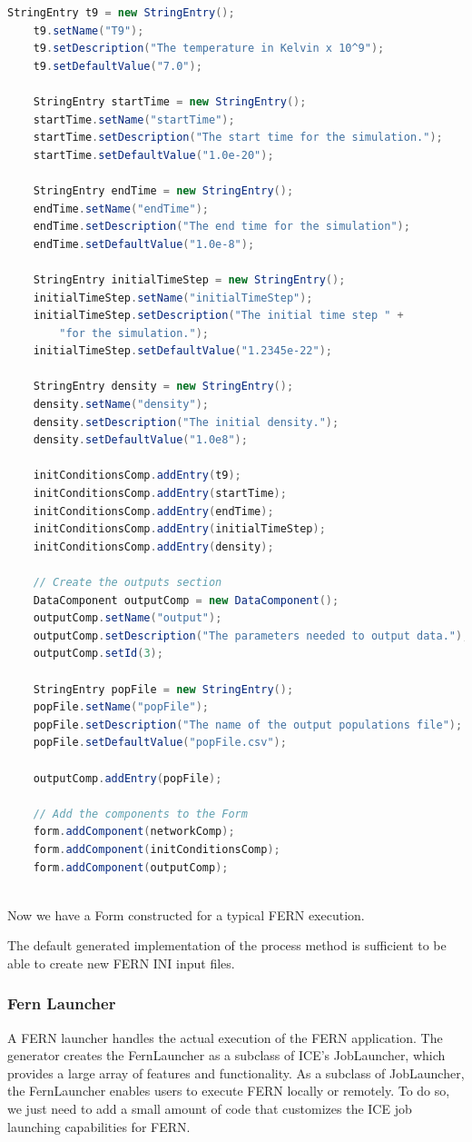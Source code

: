 \begin{lstlisting}[language=Java]
    StringEntry t9 = new StringEntry();
    t9.setName("T9");
    t9.setDescription("The temperature in Kelvin x 10^9");
    t9.setDefaultValue("7.0");

    StringEntry startTime = new StringEntry();
    startTime.setName("startTime");
    startTime.setDescription("The start time for the simulation.");
    startTime.setDefaultValue("1.0e-20");

    StringEntry endTime = new StringEntry();
    endTime.setName("endTime");
    endTime.setDescription("The end time for the simulation");
    endTime.setDefaultValue("1.0e-8");

    StringEntry initialTimeStep = new StringEntry();
    initialTimeStep.setName("initialTimeStep");
    initialTimeStep.setDescription("The initial time step " + 
    	"for the simulation."); 
    initialTimeStep.setDefaultValue("1.2345e-22");

    StringEntry density = new StringEntry();
    density.setName("density");
    density.setDescription("The initial density.");
    density.setDefaultValue("1.0e8");
    
    initConditionsComp.addEntry(t9);
    initConditionsComp.addEntry(startTime);
    initConditionsComp.addEntry(endTime);
    initConditionsComp.addEntry(initialTimeStep);
    initConditionsComp.addEntry(density);
    
    // Create the outputs section
    DataComponent outputComp = new DataComponent();
    outputComp.setName("output");
    outputComp.setDescription("The parameters needed to output data.");
    outputComp.setId(3);
    
    StringEntry popFile = new StringEntry();
    popFile.setName("popFile");
    popFile.setDescription("The name of the output populations file");
    popFile.setDefaultValue("popFile.csv");
    
    outputComp.addEntry(popFile);
    
    // Add the components to the Form
    form.addComponent(networkComp);    
    form.addComponent(initConditionsComp);
    form.addComponent(outputComp);
    
\end{lstlisting}

Now we have a Form constructed for a typical FERN execution. 

The default generated implementation of the process method is sufficient to be
able to create new FERN INI input files. 

\subsubsection{Fern Launcher}
A FERN launcher handles the actual execution of the FERN application. The
generator creates the FernLauncher as a subclass of ICE's JobLauncher, which
provides a large array of features and functionality. As a subclass of
JobLauncher, the FernLauncher enables users to execute FERN locally or remotely.
To do so, we just need to add a small amount of
code that customizes the ICE job launching capabilities for FERN. 

